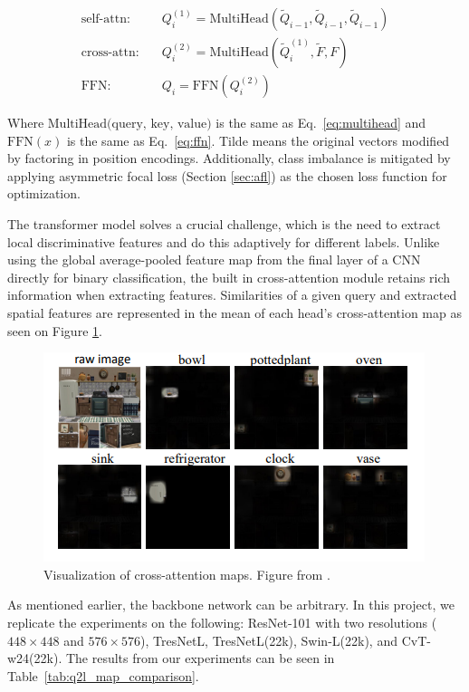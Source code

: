 \documentclass[lettersize,journal]{IEEEtran}
\begin{document}
\begin{equation}
    \begin{aligned}
    \text{self-attn:} \quad & Q^{(1)}_i = \text{MultiHead}(\tilde{Q}_{i-1}, \tilde{Q}_{i-1}, \tilde{Q}_{i-1}) \\
    \text{cross-attn:} \quad & Q^{(2)}_i = \text{MultiHead}(\tilde{Q}^{(1)}_i, \tilde{F}, F) \\
    \text{FFN:} \quad & Q_i = \text{FFN}(Q^{(2)}_i)
    \end{aligned}
\end{equation}

Where $\text{MultiHead(query, key, value)}$ is the same as Eq.~\ref{eq:multihead} and $\text{FFN}(x)$ is the same as Eq.~\ref{eq:ffn}. Tilde means the original vectors modified by factoring in position encodings. Additionally, class imbalance is mitigated by applying asymmetric focal loss (Section \ref{sec:afl}) as the chosen loss function for optimization.

The transformer model solves a crucial challenge, which is the need to extract local discriminative features and do this adaptively for different labels. Unlike using the global average-pooled feature map from the final layer of a CNN directly for binary classification, the built in cross-attention module retains rich information when extracting features. Similarities of a given query and extracted spatial features are represented in the mean of each head's cross-attention map as seen on Figure \ref{fig:q2l_attention}.

\begin{figure}[t]
    \centering
    \includegraphics[width=.8\linewidth]{images/q2l_attention.PNG}
    \caption{Visualization of cross-attention maps. Figure from \cite{Query2Label}. }
    \label{fig:q2l_attention}
\end{figure}

As mentioned earlier, the backbone network can be arbitrary. In this project, we replicate the experiments on the following: ResNet-101 with two resolutions ($448\times 448$ and $576\times 576$), TresNetL, TresNetL(22k), Swin-L(22k), and CvT-w24(22k). The results from our experiments can be seen in Table~\ref{tab:q2l_map_comparison}.
\end{document}
